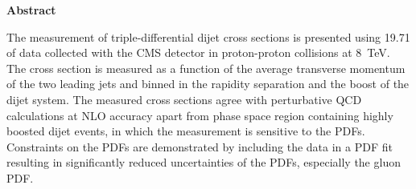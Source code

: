 \thispagestyle{plain}
\begin{center}
    \LARGE{\textbf{Abstract}}\\[2em]
\end{center}
    \normalsize
    The measurement of triple-differential dijet cross sections is presented
    using \SI{19.71}{\fbinv} of data collected with the CMS detector in
    proton-proton collisions at \SI{8}{\TeV}. The cross section is measured as a
    function of the average transverse momentum of the two leading jets and
    binned in the rapidity separation and the boost of the dijet system. The
    measured cross sections agree with perturbative QCD calculations at NLO
    accuracy apart from phase space region containing highly boosted dijet
    events, in which the measurement is sensitive to the PDFs. Constraints
    on the PDFs are demonstrated by including the data in a PDF fit resulting in
    significantly reduced uncertainties of the PDFs, especially the gluon PDF.
    \vspace{1ex}


\cleardoublepage


